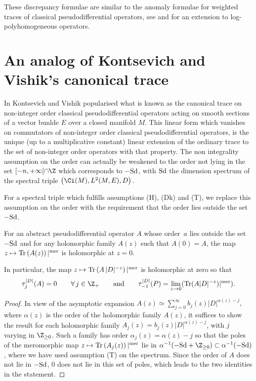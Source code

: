 These discrepancy formulae are similar to the anomaly formulae for weighted
traces of classical  pseudodif\/ferential operators, see \cite{MN,CDMP,PS}  and
 \cite{Pa1}  for an extension  to  log-polyhomogeneous operators.


\section{ An analog of Kontsevich and Vishik's canonical trace}\label{section7}

In \cite{KV} Kontsevich and Vishik popularised what is known as the canonical trace on
non-integer order classical pseudodif\/ferential operators acting on smooth
sections of a vector bunlde $E$ over a closed manifold $
M$. This linear form
which vanishes on commutators of non-integer order classical pseudodif\/ferential
operators, is the unique (up to a multiplicative constant) linear extension of the ordinary trace to the set of
non-integer order operators with that property. The non integrality assumption
on the order can actually be weakened to  the order not lying in the set  $[{-}n,+\infty[\cap
\Z$ which corresponds to $- {\rm Sd}$, with ${\rm Sd}$ the dimension spectrum of the spectral triple
$\left(\Ci(M), L^2(M, E), D\right).$

For a spectral triple which fulf\/ills assumptions (H), (Dk) and (T), we replace
this  assumption on the order  with the requirement that the
order lies outside the set $-{\rm Sd}$.

\begin{lemma} For an abstract pseudodifferential  operator $A$ whose order~$a$ lies outside the set $ -{\rm Sd}$  and for any
  holomorphic family $A(z)$ such that $A(0)=A$,
 the map $z\mapsto {\rm Tr} \left( A(z) \right)\vert^{\rm mer}$ is holomorphic at
  $z=0$.

 In particular,  the map $z\mapsto  {\rm
    Tr} \left( A\, \vert D\vert^{-z}\right)\vert^{\rm mer} $ is holomorphic at
  zero so that
  \[
  \tau_j^{\vert D\vert}(A)=0\qquad \forall\, j\in \Z_+\qquad {\rm and}\qquad \tau_{-1}^{\vert D\vert} (P)=\lim_{z\to 0} ({\rm
    Tr}  ( A \vert D\vert^{-z} )\vert^{\rm mer} ).
    \]
\end{lemma}
\begin{proof} In view of the asymptotic expansion $A(z)\simeq \sum\limits_{j=0}^\infty
b_j (z)\vert D\vert^{\alpha(z)-j},$
where   $\alpha(z)$ is the  order of the holomorphic family $A(z)$,
it suf\/f\/ices to show the result for each holomorphic family $A_j(z)= b_j(z)
\vert D\vert^{\alpha(z)-j}$, with $j$ varying in $\Z_{\geq 0}$.
Such a family  has order $\alpha_j(z)= \alpha(z)-j$ so that the  poles of the meromorphic map $z\mapsto {\rm
    Tr} \left( A_j(z) \right)\vert^{\rm mer}$  lie in
  $\alpha^{-1}(-{\rm Sd}+\Z_{\geq 0})\subset \alpha^{-1}(-{\rm Sd})$, where we have used
  assumption (T) on the spectrum.
 Since    the order of $A$ does not lie in $-{\rm Sd}$, $0$ does not lie in this set of
poles, which leads to the two identities in the statement.\end{proof}
